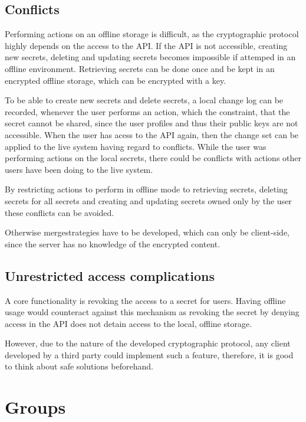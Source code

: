 \subsection{Conflicts}

Performing actions on an offline storage is difficult, as the cryptographic
protocol highly depends on the access to the API. If the API is not accessible,
creating new secrets, deleting and updating secrets becomes impossible if
attemped in an offline environment. Retrieving secrets can be done once and be
kept in an encrypted offline storage, which can be encrypted with a key.

To be able to create new secrets and delete secrets, a local change log can be
recorded, whenever the user performs an action, which the constraint, that the
secret cannot be shared, since the user profiles and thus their public keys are
not accessible. When the user has acess to the API again, then the change set
can be applied to the live system having regard to conflicts. While the user
was performing actions on the local secrets, there could be conflicts with
actions other users have been doing to the live system.

By restricting actions to perform in offline mode to retrieving secrets,
deleting secrets for all secrets and creating and updating secrets owned only
by the user these conflicts can be avoided.

Otherwise mergestrategies have to be developed, which can only be client-side,
since the server has no knowledge of the encrypted content.

\subsection{Unrestricted access complications}

A core functionality is revoking the access to a secret for users. Having
offline usage would counteract against this mechanism as revoking the secret by
denying access in the API does not detain access to the local, offline storage.

However, due to the nature of the developed cryptographic protocol, any client
developed by a third party could implement such a feature, therefore, it is
good to think about safe solutions beforehand.

\section{Groups}

